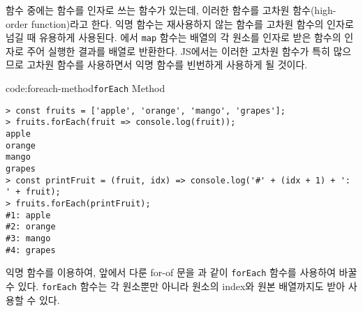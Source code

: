 함수 중에는 함수를 인자로 쓰는 함수가 있는데, 이러한 함수를 고차원 함수(high-order function)라고 한다. 익명 함수는 재사용하지 않는 함수를 고차원 함수의 인자로 넘길 때 유용하게 사용된다. 에서 \texttt{map} 함수는 배열의 각 원소를 인자로 받은 함수의 인자로 주어 실행한 결과를 배열로 반환한다. JS에서는 이러한 고차원 함수가 특히 많으므로 고차원 함수를 사용하면서 익명 함수를 빈번하게 사용하게 될 것이다.

\begin{codeenv}{code:foreach-method}{\texttt{forEach} Method}\begin{verbatim}
> const fruits = ['apple', 'orange', 'mango', 'grapes'];
> fruits.forEach(fruit => console.log(fruit));
apple
orange
mango
grapes
> const printFruit = (fruit, idx) => console.log('#' + (idx + 1) + ': ' + fruit);
> fruits.forEach(printFruit);
#1: apple
#2: orange
#3: mango
#4: grapes
\end{verbatim}
\end{codeenv}

익명 함수를 이용하여, 앞에서 다룬 for-of 문을 과 같이 \texttt{forEach} 함수를 사용하여 바꿀 수 있다. \texttt{forEach} 함수는 각 원소뿐만 아니라 원소의 index와 원본 배열까지도 받아 사용할 수 있다.
